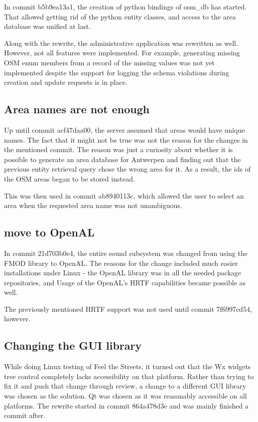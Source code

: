 \documentclass[nolof,digital]{fithesis3}
\begin{document}
In commit b5b9ea13a1, the creation of python bindings of osm\_db has started. That allowed getting rid of the python entity classes, and access to the area database was unified at last.

Along with the rewrite, the administrative application was rewritten as well. However, not all features were implemented. For example, generating missing OSM enum members from a record of the missing values was not yet implemented despite the support for logging the schema violations during creation and update requests is in place.
\subsection{Area names are not enough}
Up until commit acf47daa00, the server assumed that areas would have unique names. The fact that it might not be true was not the reason for the changes in the mentioned commit. The reason was just a curiosity about whether it is possible to generate an area database for Antwerpen and finding out that the previous entity retrieval query chose the wrong area for it. As a result, the ids of the OSM areas began to be stored instead.

This was then used in commit ab8940113c, which allowed the user to select an area when the requested area name was not unambiguous.
\subsection{move to OpenAL}
In commit 21d703b0e4, the entire sound subsystem was changed from using the FMOD library \parencite{fmod} to OpenAL. The reasons for the change included much easier installations under Linux - the OpenAL library was in all the needed package repositories, and Usage of the OpenAL's HRTF capabilities became possible as well.

The previously mentioned HRTF support was not used until commit 7f6997cd54, however.
\subsection{Changing the GUI library}
While doing Linux testing of Feel the Streets, it turned out that the Wx widgets tree control completely lacks accessibility on that platform. Rather than trying to fix it and push that change through review, a change to a different GUI library was chosen as the solution. Qt was chosen as it was reasonably accessible on all platforms. The rewrite started in commit 864a478d3e and was mainly finished a commit after.
\end{document}

